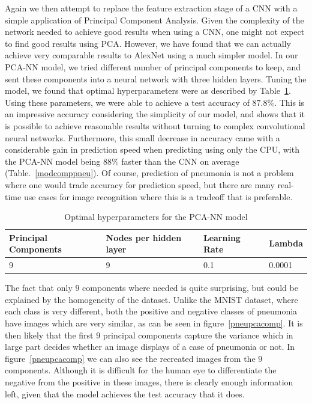 \documentclass[onecolumn,10pt,cleanfoot]{asme2ej}
\begin{document}
Again we then attempt to replace the feature extraction stage of a CNN with a simple application of Principal Component Analysis. Given the complexity of the network needed to achieve good results when using a CNN, one might not expect to find good results using PCA. However, we have found that we can actually achieve very comparable results to AlexNet using a much simpler model. In our PCA-NN model, we tried different number of principal components to keep, and sent these components into a neural network with three hidden layers. Tuning the model, we found that optimal hyperparameters were as described by Table~\ref{pcanntable}. Using these parameters, we were able to achieve a test accuracy of $87.8\%$. This is an impressive accuracy considering the simplicity of our model, and shows that it is possible to achieve reasonable results without turning to complex convolutional neural networks. Furthermore, this small decrease in accuracy came with a considerable gain in prediction speed when predicting using only the CPU, with the PCA-NN model being $88\%$ faster than the CNN on average (Table.~\ref{modcomppneu}). Of course, prediction of pneumonia is not a problem where one would trade accuracy for prediction speed, but there are many real-time use cases for image recognition where this is a tradeoff that is preferable.

\begin{table}[H]
\caption{Optimal hyperparameters for the PCA-NN model}
\begin{center}
\label{pcanntable}
\begin{tabular}{| l | l | l | l |}
\hline
Principal Components & Nodes per hidden layer & Learning Rate & Lambda \\
\hline
9 & 9 & 0.1 & 0.0001 \\
\hline
\end{tabular}
\end{center}
\end{table}

The fact that only $9$ components where needed is quite surprising, but could be explained by the homogeneity of the dataset. Unlike the MNIST dataset, where each class is very different, both the positive and negative classes of pneumonia have images which are very similar, as can be seen in figure~\ref{pneupcacomp}. It is then likely that the first $9$ principal components capture the variance which in large part decides whether an image displays of a case of pneumonia or not. In figure~\ref{pneupcacomp} we can also see the recreated images from the $9$ components. Although it is difficult for the human eye to differentiate the negative from the positive in these images, there is clearly enough information left, given that the model achieves the test accuracy that it does.
\end{document}

